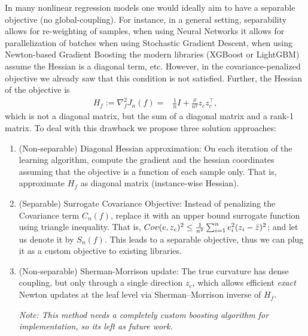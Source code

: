 \documentclass[11pt]{article}
\theoremstyle{plain}
\theoremstyle{definition}
\newcommand{\1}{\mathbf{1}}
\renewcommand{\t}{^{\top}}
\begin{document}
{ In many nonlinear regression models one would ideally aim to have a separable objective (no global-coupling). For instance, in a general setting, separability allows for re-weighting of samples, when using Neural Networks it allows for parallelization of batches when using Stochastic Gradient Descent, when using Newton-based Gradient Boosting the modern libraries (XGBoost or LightGBM) assume the Hessian is a diagonal term, etc. However, in the covariance-penalized objective we already saw that this condition is not satisfied. Further, the Hessian of the objective is 
\begin{align}
\label{def:loss_hessian}
    H_f:=\nabla^2_f J_n(f) =& \frac{1}{n}  I +  \frac{\rho }{n^2} z_c z_c\t,  
\end{align}
which is not a diagonal matrix, but the sum of a diagonal matrix and a rank-1 matrix. To deal with this drawback we propose three solution approaches:
\begin{enumerate}
    \item (Non-separable) {Diagonal Hessian approximation:} On each iteration of the learning algorithm, compute the gradient and the hessian coordinates assuming that the objective is a function of each sample only. That is, approximate $H_f$ as diagonal matrix (instance-wise Hessian).

    \item (Separable) Surrogate Covariance Objective: Instead of penalizing the Covariance term $C_n(f)$, replace it with an upper bound surrogate function using triangle inequality. That is, $Cov(e, z_c)^2 \leq \frac{1}{n^2}\sum_{i=1}^n e_i^2(z_i - \Bar{z})^2 $; and let us denote it by $S_n(f)$. This leads to a separable objective, thus we can plug it as a custom objective to existing libraries.

    \item (Non-separable) {Sherman-Morrison update:} The true curvature has dense coupling, but only through a single direction \( z_c\), which allows efficient \emph{exact} Newton updates at the leaf level via Sherman--Morrison inverse of $H_f$. 
    
    \textit{Note: This method needs a completely custom boosting algorithm for implementation, so its left as future work.}
\end{enumerate}




}
\end{document}
